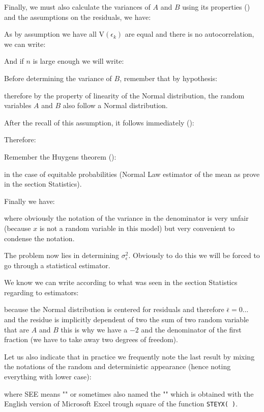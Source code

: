 	Finally, we must also calculate the variances of $A$ and $B$ using its properties () and the assumptions on the residuals, we have:
	
	As by assumption we have all $\text{V}(\epsilon_k)$ are equal and there is no autocorrelation, we can write:
	
	And if $n$ is large enough we will write:
	
	Before determining the variance of $B$, remember that by hypothesis:
	
	therefore by the property of linearity of the Normal distribution, the random variables $A$ and $B$ also follow a Normal distribution.
	
	After the recall of this assumption, it follows immediately ():
	
	Therefore:
	
	Remember the Huygens theorem ():
	
	in the case of equitable probabilities (Normal Law estimator of the mean as prove in the section Statistics).
	
	Finally we have:
	
	where obviously the notation of the variance in the denominator is very unfair (because $x$ is not a random variable in this model) but very convenient to condense the notation.
	
	The problem now lies in determining $\sigma_\epsilon^2$. Obviously to do this we will be forced to go through a statistical estimator.
	
	We know we can write according to what was seen in the section Statistics regarding to estimators:
	
	because the Normal distribution is centered for residuals and therefore $\bar{\epsilon}=0$... and the residue is implicitly dependent of two the sum of two random variable that are $A$ and $B$ this is why we have a $-2$ and the denominator of the first fraction (we have to take away two degrees of freedom).
	
	Let us also indicate that in practice we frequently note the last result by mixing the notations of the random and deterministic appearance (hence noting everything with lower case):
	
	where SEE means "" or sometimes also named  the "" which is obtained with the English version of Microsoft Excel trough square of the function \texttt{STEYX( )}.
	
